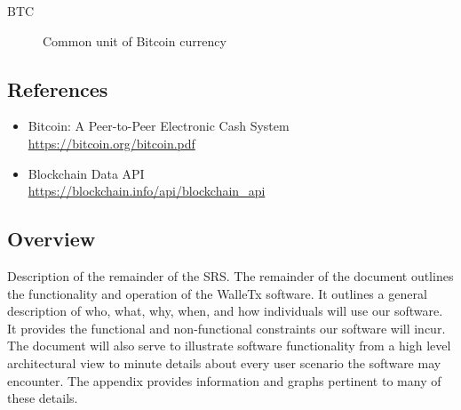 	\begin{description}
		\item[BTC] Common unit of Bitcoin currency
	\end{description}

	\subsection{References}

	\begin{itemize}
		\item Bitcoin: A Peer-to-Peer Electronic Cash System\\ \url{https://bitcoin.org/bitcoin.pdf}
		\item Blockchain Data API\\ \url{https://blockchain.info/api/blockchain_api}
	\end{itemize}

	\subsection{Overview}

  Description of the remainder of the SRS.
  The remainder of the document outlines the functionality and operation of the WalleTx software. It outlines a general description of who, what, why, when, and how individuals will use our software. It provides the functional and non-functional constraints our software will incur. The document will also serve to illustrate software functionality from a high level architectural view to minute details about every user scenario the software may encounter. The appendix provides information and graphs pertinent to many of these details.
